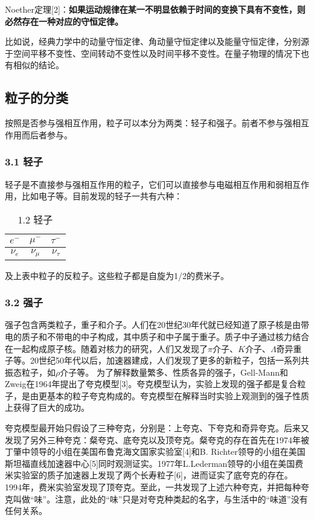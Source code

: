 Noether定理[2]：\textbf{如果运动规律在某一不明显依赖于时间的变换下具有不变性，则必然存在一种对应的守恒定律。}

比如说，经典力学中的动量守恒定律、角动量守恒定律以及能量守恒定律，分别源于空间平移不变性、空间转动不变性以及时间平移不变性。在量子物理的情况下也有相似的结论。

\subsection{粒子的分类}
按照是否参与强相互作用，粒子可以本分为两类：轻子和强子。前者不参与强相互作用而后者参与。

\subsubsection{3.1 轻子}
轻子是不直接参与强相互作用的粒子，它们可以直接参与电磁相互作用和弱相互作用，比如电子等。目前发现的轻子一共有六种：
\begin{table}[h!]
\centering
\caption{1.2 轻子}
\begin{tabular}{|c|c|c|} 
\hline
$e^-$ & $\mu^-$ & $\tau^-$ \\
\hline
$\nu_e$ & $\nu_\mu$ & $\nu_\tau$ \\
\hline
\end{tabular}
\end{table}
及上表中粒子的反粒子。这些粒子都是自旋为1/2的费米子。
\subsubsection{3.2 强子}
强子包含两类粒子，重子和介子。人们在20世纪30年代就已经知道了原子核是由带电的质子和不带电的中子构成，其中质子和中子属于重子。质子中子通过核力结合在一起构成原子核。随着对核力的研究，人们又发现了$\pi$介子、$K$介子、$\Lambda$奇异重子等。20世纪50年代以后，加速器建成，人们发现了更多的新粒子，包括一系列共振态粒子，如$\rho$介子等。
为了解释数量繁多、性质各异的强子，Gell-Mann和Zweig在1964年提出了夸克模型[3]。夸克模型认为，实验上发现的强子都是复合粒子，是由更基本的粒子夸克构成的。夸克模型在解释当时实验上观测到的强子性质上获得了巨大的成功。

夸克模型最开始只假设了三种夸克，分别是：上夸克、下夸克和奇异夸克。后来又发现了另外三种夸克：粲夸克、底夸克以及顶夸克。粲夸克的存在首先在1974年被丁肇中领导的小组在美国布鲁克海文国家实验室[4]和B. Richter领导的小组在美国斯坦福直线加速器中心[5]同时观测证实。1977年L.Lederman领导的小组在美国费米实验室的质子加速器上发现了两个长寿粒子[6]，进而证实了底夸克的存在。1994年，费米实验室发现了顶夸克。至此，一共发现了上述六种夸克，并把每种夸克叫做“味”。注意，此处的“味”只是对夸克种类起的名字，与生活中的“味道”没有任何关系。

